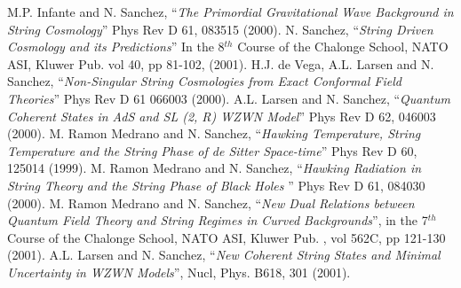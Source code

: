 \documentclass[12pt,a4paper]{article}
\begin{document}
\begin{thebibliography}{8}
 M.P. Infante and N. Sanchez, ``{\it The Primordial Gravitational Wave Background in String Cosmology}'' Phys Rev D 61, 083515 (2000).
 N. Sanchez, ``{\it String Driven Cosmology and its Predictions}''
In the 8$^{th}$ Course of the Chalonge School, NATO ASI, Kluwer Pub. vol 40, 
pp 81-102, (2001).
 H.J. de Vega, A.L. Larsen and N. Sanchez, ``{\it Non-Singular 
String Cosmologies from Exact Conformal Field Theories}'' Phys Rev D 61
066003 (2000).
 A.L. Larsen and N. Sanchez, ``{\it Quantum Coherent States in AdS and SL (2, R) WZWN Model}'' Phys Rev D 62, 046003 (2000).
 M. Ramon Medrano and N. Sanchez, ``{\it Hawking Temperature, 
String Temperature and the String Phase of de Sitter Space-time}'' Phys Rev 
D 60, 125014 (1999).
 M. Ramon Medrano and N. Sanchez, ``{\it Hawking Radiation in 
String Theory and the String Phase of Black Holes }'' Phys Rev D 61, 084030 
(2000).
 M. Ramon Medrano and N. Sanchez, ``{\it New Dual Relations 
between Quantum Field Theory and String Regimes in Curved Backgrounds}'', in 
the 7$^{th}$ Course of the Chalonge School, NATO ASI, Kluwer Pub. , vol 562C, 
pp 121-130 (2001).
 A.L. Larsen and N. Sanchez, ``{\it New Coherent String States and Minimal Uncertainty in WZWN Models}'', Nucl, Phys. B618, 301 (2001). 
\end{thebibliography}
\end{document}
